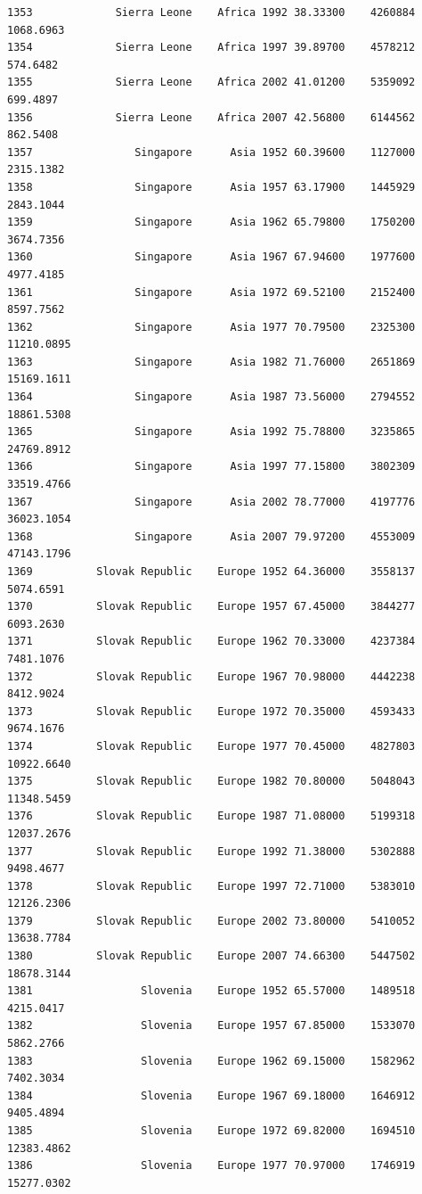 \documentclass[
  letterpaper,
  DIV=11,
  numbers=noendperiod]{scrreprt}
\begin{document}
\begin{verbatim}
1353             Sierra Leone    Africa 1992 38.33300    4260884   1068.6963
1354             Sierra Leone    Africa 1997 39.89700    4578212    574.6482
1355             Sierra Leone    Africa 2002 41.01200    5359092    699.4897
1356             Sierra Leone    Africa 2007 42.56800    6144562    862.5408
1357                Singapore      Asia 1952 60.39600    1127000   2315.1382
1358                Singapore      Asia 1957 63.17900    1445929   2843.1044
1359                Singapore      Asia 1962 65.79800    1750200   3674.7356
1360                Singapore      Asia 1967 67.94600    1977600   4977.4185
1361                Singapore      Asia 1972 69.52100    2152400   8597.7562
1362                Singapore      Asia 1977 70.79500    2325300  11210.0895
1363                Singapore      Asia 1982 71.76000    2651869  15169.1611
1364                Singapore      Asia 1987 73.56000    2794552  18861.5308
1365                Singapore      Asia 1992 75.78800    3235865  24769.8912
1366                Singapore      Asia 1997 77.15800    3802309  33519.4766
1367                Singapore      Asia 2002 78.77000    4197776  36023.1054
1368                Singapore      Asia 2007 79.97200    4553009  47143.1796
1369          Slovak Republic    Europe 1952 64.36000    3558137   5074.6591
1370          Slovak Republic    Europe 1957 67.45000    3844277   6093.2630
1371          Slovak Republic    Europe 1962 70.33000    4237384   7481.1076
1372          Slovak Republic    Europe 1967 70.98000    4442238   8412.9024
1373          Slovak Republic    Europe 1972 70.35000    4593433   9674.1676
1374          Slovak Republic    Europe 1977 70.45000    4827803  10922.6640
1375          Slovak Republic    Europe 1982 70.80000    5048043  11348.5459
1376          Slovak Republic    Europe 1987 71.08000    5199318  12037.2676
1377          Slovak Republic    Europe 1992 71.38000    5302888   9498.4677
1378          Slovak Republic    Europe 1997 72.71000    5383010  12126.2306
1379          Slovak Republic    Europe 2002 73.80000    5410052  13638.7784
1380          Slovak Republic    Europe 2007 74.66300    5447502  18678.3144
1381                 Slovenia    Europe 1952 65.57000    1489518   4215.0417
1382                 Slovenia    Europe 1957 67.85000    1533070   5862.2766
1383                 Slovenia    Europe 1962 69.15000    1582962   7402.3034
1384                 Slovenia    Europe 1967 69.18000    1646912   9405.4894
1385                 Slovenia    Europe 1972 69.82000    1694510  12383.4862
1386                 Slovenia    Europe 1977 70.97000    1746919  15277.0302

\end{verbatim}
\end{document}
